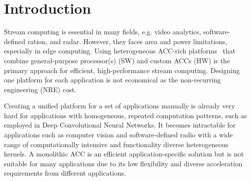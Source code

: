 \vspace{-3pt}
\section{Introduction}
\label{sec:introduction}



Stream computing is essential in many fields, e.g. video analytics, software-defined ration, and radar. However, they faces area and power limitations, especially in edge computing. 
Using heterogeneous ACC-rich platforms~\cite{melpignano2012platform} that combine general-purpose processor(s) (SW) and custom ACCs (HW) is the primary approach for efficient, high-performance stream computing.
Designing one platform for each application is not economical as the non-recurring engineering (NRE) cost.

Creating a unified platform for a set of applications manually is already very hard for applications with homogeneous, repeated computation patterns, such as employed in Deep Convolutional Neural Networks\cite{chen2018eyeriss}. 
It becomes intractable for applications such as computer vision and software-defined radio with a wide range of computationally intensive and functionality diverse heterogeneous kernels. 
A monolithic ACC is an efficient application-specific solution but is not suitable for many applications due to its low flexibility and diverse acceleration requirements from different applications.

